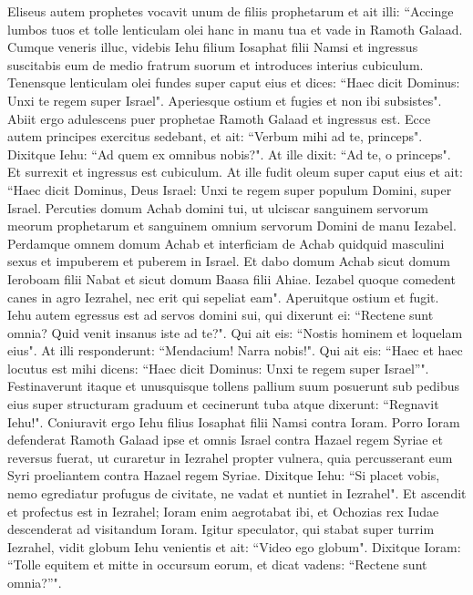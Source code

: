 \begin{biblechapter}  
\verse Eliseus autem prophetes vocavit unum de filiis prophetarum et ait illi: “Accinge lumbos tuos et tolle lenticulam olei hanc in manu tua et vade in Ramoth Galaad. 
\verse Cumque veneris illuc, videbis Iehu filium Iosaphat filii Namsi et ingressus suscitabis eum de medio fratrum suorum et introduces interius cubiculum. 
\verse Tenensque lenticulam olei fundes super caput eius et dices: “Haec dicit Dominus: Unxi te regem super Israel". Aperiesque ostium et fugies et non ibi subsistes". 
\verse Abiit ergo adulescens puer prophetae Ramoth Galaad 
\verse et ingressus est. Ecce autem principes exercitus sedebant, et ait: “Verbum mihi ad te, princeps". Dixitque Iehu: “Ad quem ex omnibus nobis?". At ille dixit: “Ad te, o princeps". 
\verse Et surrexit et ingressus est cubiculum. At ille fudit oleum super caput eius et ait: “Haec dicit Dominus, Deus Israel: Unxi te regem super populum Domini, super Israel. 
\verse Percuties domum Achab domini tui, ut ulciscar sanguinem servorum meorum prophetarum et sanguinem omnium servorum Domini de manu Iezabel. 
\verse Perdamque omnem domum Achab et interficiam de Achab quidquid masculini sexus et impuberem et puberem in Israel. 
\verse Et dabo domum Achab sicut domum Ieroboam filii Nabat et sicut domum Baasa filii Ahiae.  
\verse Iezabel quoque comedent canes in agro Iezrahel, nec erit qui sepeliat eam". Aperuitque ostium et fugit. 
\verse Iehu autem egressus est ad servos domini sui, qui dixerunt ei: “Rectene sunt omnia? Quid venit insanus iste ad te?". Qui ait eis: “Nostis hominem et loquelam eius". 
\verse At illi responderunt: “Mendacium! Narra nobis!". Qui ait eis: “Haec et haec locutus est mihi dicens: “Haec dicit Dominus: Unxi te regem super Israel”". 
\verse Festinaverunt itaque et unusquisque tollens pallium suum posuerunt sub pedibus eius super structuram graduum et cecinerunt tuba atque dixerunt: “Regnavit Iehu!". 
\verse Coniuravit ergo Iehu filius Iosaphat filii Namsi contra Ioram. Porro Ioram defenderat Ramoth Galaad ipse et omnis Israel contra Hazael regem Syriae 
\verse et reversus fuerat, ut curaretur in Iezrahel propter vulnera, quia percusserant eum Syri proeliantem contra Hazael regem Syriae. Dixitque Iehu: “Si placet vobis, nemo egrediatur profugus de civitate, ne vadat et nuntiet in Iezrahel".  
\verse Et ascendit et profectus est in Iezrahel; Ioram enim aegrotabat ibi, et Ochozias rex Iudae descenderat ad visitandum Ioram. 
\verse Igitur speculator, qui stabat super turrim Iezrahel, vidit globum Iehu venientis et ait: “Video ego globum". Dixitque Ioram: “Tolle equitem et mitte in occursum eorum, et dicat vadens: “Rectene sunt omnia?”". 

\end{biblechapter}
